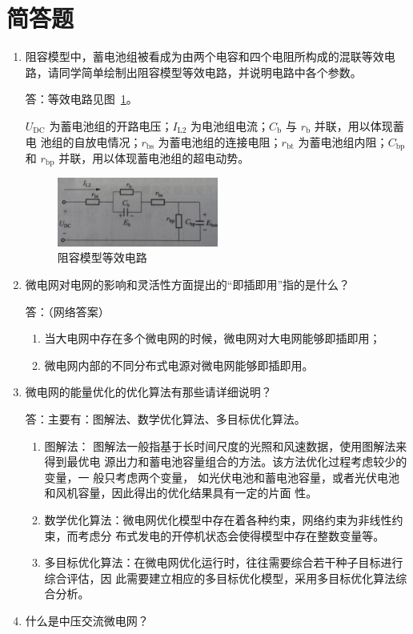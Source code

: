 \documentclass[zihao=-4]{ctexart}
\begin{document}
\section{简答题}
\begin{enumerate}
\item 阻容模型中，蓄电池组被看成为由两个电容和四个电阻所构成的混联等效电路，请同学简单绘制出阻容模型等效电路，并说明电路中各个参数。

\newcommand{\xiabiao}[2]{#1_\mathrm{#2}}
\noindent 答：等效电路见图~\ref{fig:1}。

$U_{\mathrm{DC}}$ 为蓄电池组的开路电压；$I_{\mathrm{L2}}$ 为电池组电流；$C_{\mathrm{b}}$ 与 $r_{\mathrm{b}}$ 并联，用以体现蓄电
池组的自放电情况；$r_{\mathrm{bs}}$ 为蓄电池组的连接电阻；$\xiabiao{r}{bt}$ 为蓄电池组内阻；$\xiabiao{C}{bp}$ 和 $\xiabiao{r}{bp}$ 并联，用以体现蓄电池组的超电动势。
\begin{figure}[!htbp]
  \centering
  \includegraphics[width=0.5\textwidth]{fig1.png}
  \caption{阻容模型等效电路}\label{fig:1}
\end{figure}
\item 微电网对电网的影响和灵活性方面提出的“即插即用”指的是什么？

\noindent 答：（网络答案）
\begin{enumerate}
  \item 当大电网中存在多个微电网的时候，微电网对大电网能够即插即用；
  \item 微电网内部的不同分布式电源对微电网能够即插即用。
\end{enumerate}
\item 微电网的能量优化的优化算法有那些请详细说明？

\noindent 答：主要有：图解法、数学优化算法、多目标优化算法。
\begin{enumerate}
  \item 图解法： 图解法一般指基于长时间尺度的光照和风速数据，使用图解法来得到最优电
  源出力和蓄电池容量组合的方法。该方法优化过程考虑较少的变量，一 般只考虑两个变量，
  如光伏电池和蓄电池容量，或者光伏电池和风机容量，因此得出的优化结果具有一定的片面
  性。
  \item 数学优化算法：微电网优化模型中存在着各种约束，网络约束为非线性约束，而考虑分
  布式发电的开停机状态会使得模型中存在整数变量等。
  \item 多目标优化算法：在微电网优化运行时，往往需要综合若干种子目标进行综合评估，因
  此需要建立相应的多目标优化模型，采用多目标优化算法综合分析。
\end{enumerate}
\item 什么是中压交流微电网？


\end{enumerate}
\end{document}
